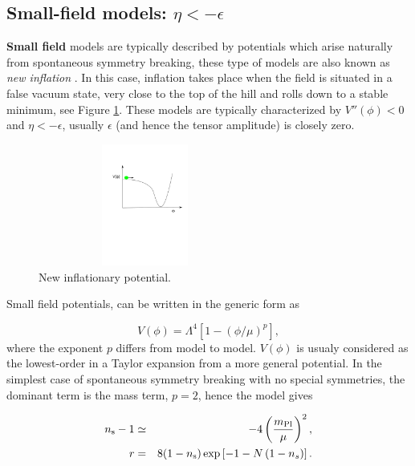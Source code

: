 \documentclass{rmaa}
\def\bea{\begin{eqnarray}}
\def\eea{\end{eqnarray}}
\begin{document}
\subsection{Small-field models: $\eta < -\epsilon$}


\textbf{Small field} models are typically described by potentials which arise 
naturally from spontaneous symmetry breaking, these type of models are also
known as \textit{new inflation} \citep{Steinhardt, Linde2}. 
In this case, inflation takes place when the field is situated in a false vacuum state,
very close to the top of the hill and rolls down to a stable minimum, see Figure \ref{fig:new2}. 
These models are typically characterized by $V''\left(\phi\right) < 0$
and $\eta < -\epsilon$, usually $\epsilon$ (and hence the tensor amplitude)
is closely zero. 

 \begin{figure}
 \begin{center}
  \includegraphics[trim = 20mm 120mm 10mm 40mm, clip, width=7cm, height=4cm]{new1.pdf}
	\caption{New inflationary potential.}
	\label{fig:new2}
 \end{center}	
\end{figure}

\noindent
Small field potentials, can be written in the generic form as

\begin{equation}
V\left(\phi\right) = \Lambda^4 \left[1 - \left(\phi / \mu\right)^p\right],
\end{equation}
%
where the exponent $p$ differs from model to model. $V(\phi)$ is usualy considered as the 
lowest-order in a Taylor expansion from a more general potential.
In the simplest case of spontaneous symmetry breaking with no special symmetries, 
the dominant term is the mass term, $p = 2$, hence the model gives

\bea
n_{\rm s}-1&\simeq& -4\left( \frac{m_{\rm Pl}}{\mu}\right)^2, \nonumber \\
r &=& 8 (1 - n_{\rm s}) \exp\left[- 1 - N\left(1 - n_s\right)\right].
\eea
\end{document}
